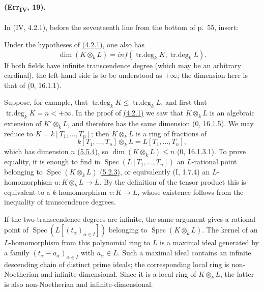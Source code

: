 \paragraph{(Err\textsubscript{IV}, 19).}
In (IV, 4.2.1), before the seventeenth line from the bottom of p.~55,
insert:

\begin{remark}[4.2.1.4]
\label{IV.4.2.1.4}
Under the hypotheses of {\hyperlink{ega4.c04.prop.4-2-1}{(4.2.1)}}, one also has
\begin{equation}
 \dim(K\otimes_kL)=inf(\operatorname{tr.deg}_kK,
                           \operatorname{tr.deg}_kL). \label{IV.4.2.1.5}
\tag{4.2.1.5}
\end{equation}
If both fields have infinite transcendence degree (which may be an
arbitrary cardinal), the left-hand side is to be understood as
$+\infty$; the dimension here is that of ($0$, 16.1.1).

Suppose, for example, that
$\operatorname{tr.deg}_kK\leq\operatorname{tr.deg}_kL$, and first that
$\operatorname{tr.deg}_kK=n<+\infty$.  In the proof of {\hyperlink{ega4.c04.prop.4-2-1}{(4.2.1)}} we saw
that $K\otimes_kL$ is an algebraic extension of $K'\otimes_kL$, and
therefore has the same dimension ($0$, 16.1.5).  We may reduce to
$K=k[T_1,\ldots,T_n]$; then $K\otimes_kL$ is a ring of fractions of
\[
 k[T_1,\ldots,T_n]\otimes_kL=L[T_1,\ldots,T_n],
\]
which has dimension $n$ {\hyperlink{ega4.c04.cor.5-5-4}{(5.5.4)}}, so
$\dim(K\otimes_kL)\leq n$ ($0$, 16.1.3.1).  To prove equality, it is
enough to find in $\operatorname{Spec}(L[T_1,\ldots,T_n])$ an
$L$-rational point belonging to $\operatorname{Spec}(K\otimes_kL)$
{\hyperlink{ega4.c04.cor.5-2-3}{(5.2.3)}}, or equivalently (I, 1.7.4) an $L$-homomorphism
$u:K\otimes_kL\to L$.  By the definition of the tensor product this is
equivalent to a $k$-homomorphism $v:K\to L$, whose existence follows
from the inequality of transcendence degrees.

If the two transcendence degrees are infinite, the same argument gives
a rational point of $\operatorname{Spec}(L[(t_\alpha)_{\alpha\in I}])$
belonging to $\operatorname{Spec}(K\otimes_kL)$.  The kernel of an
$L$-homomorphism from this polynomial ring to $L$ is a maximal ideal
generated by a family $(t_\alpha-a_\alpha)_{\alpha\in I}$ with
$a_\alpha\in L$.  Such a maximal ideal contains an infinite descending
chain of distinct prime ideals; the corresponding local ring is
non-Noetherian and infinite-dimensional.  Since it is a local ring of
$K\otimes_kL$, the latter is also non-Noetherian and
infinite-dimensional.
\end{remark}

